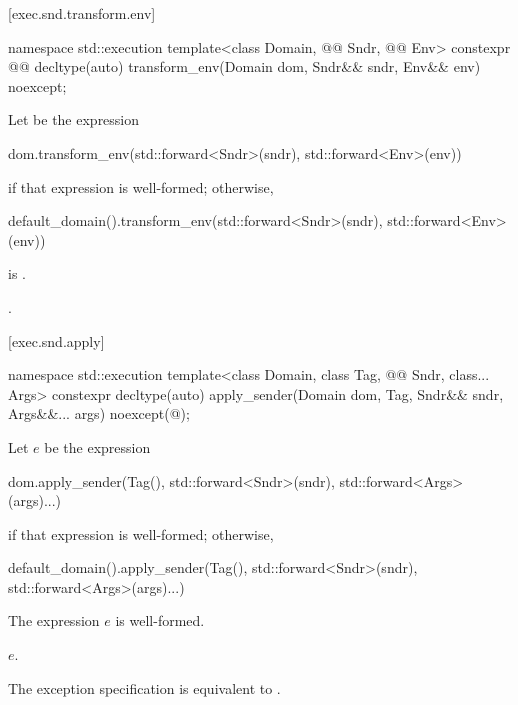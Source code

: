 [exec.snd.transform.env]{}

%
\begin{itemdecl}
namespace std::execution {
  template<class Domain, @@ Sndr, @@ Env>
    constexpr @@ decltype(auto) transform_env(Domain dom, Sndr&& sndr, Env&& env) noexcept;
}
\end{itemdecl}

\begin{itemdescr}
\pnum
Let  be the expression
\begin{codeblock}
dom.transform_env(std::forward<Sndr>(sndr), std::forward<Env>(env))
\end{codeblock}
if that expression is well-formed; otherwise,
\begin{codeblock}
default_domain().transform_env(std::forward<Sndr>(sndr), std::forward<Env>(env))
\end{codeblock}

\pnum
\mandates
{} is .

\pnum
\returns
{}.
\end{itemdescr}

[exec.snd.apply]{}

%
\begin{itemdecl}
namespace std::execution {
  template<class Domain, class Tag, @@ Sndr, class... Args>
    constexpr decltype(auto) apply_sender(Domain dom, Tag, Sndr&& sndr, Args&&... args)
      noexcept(@\seebelow@);
}
\end{itemdecl}

\begin{itemdescr}
\pnum
Let $e$ be the expression
\begin{codeblock}
dom.apply_sender(Tag(), std::forward<Sndr>(sndr), std::forward<Args>(args)...)
\end{codeblock}
if that expression is well-formed; otherwise,
\begin{codeblock}
default_domain().apply_sender(Tag(), std::forward<Sndr>(sndr), std::forward<Args>(args)...)
\end{codeblock}

\pnum
\constraints
The expression $e$ is well-formed.

\pnum
\returns
$e$.

\pnum
\remarks
The exception specification is equivalent to .
\end{itemdescr}

